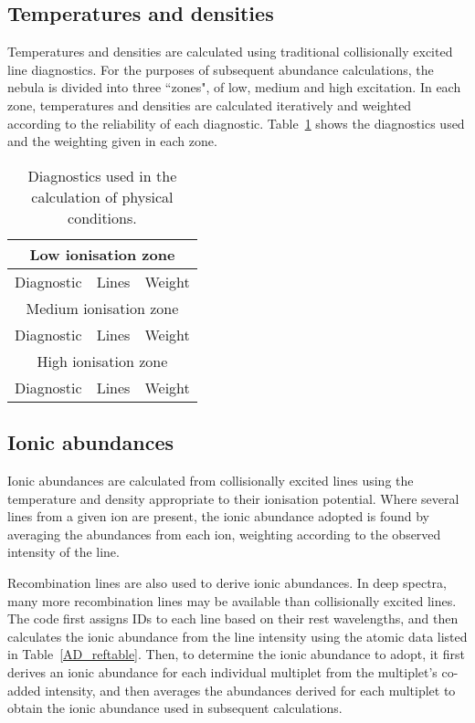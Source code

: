 \documentclass[useAMS,usenatbib]{mn2e}
\begin{document}
\subsection{Temperatures and densities}

Temperatures and densities are calculated using traditional collisionally excited line diagnostics.  For the purposes of subsequent abundance calculations, the nebula is divided into three ``zones", of low, medium and high excitation.  In each zone, temperatures and densities are calculated iteratively and weighted according to the reliability of each diagnostic.  Table~\ref{zonestable} shows the diagnostics used and the weighting given in each zone.

\begin{table}
\begin{tabular}{ccc}
\hline
\multicolumn{3}{c}{Low ionisation zone}\\
\hline
Diagnostic & Lines & Weight \\
\hline
\multicolumn{3}{c}{Medium ionisation zone}\\
\hline
Diagnostic & Lines & Weight \\
\hline
\multicolumn{3}{c}{High ionisation zone}\\
\hline
Diagnostic & Lines & Weight \\
\end{tabular}
\label{zonestable}
\caption{Diagnostics used in the calculation of physical conditions.}
\end{table}

\subsection{Ionic abundances}

Ionic abundances are calculated from collisionally excited lines using the temperature and density appropriate to their ionisation potential.  Where several lines from a given ion are present, the ionic abundance adopted is found by averaging the abundances from each ion, weighting according to the observed intensity of the line.

Recombination lines are also used to derive ionic abundances.  In deep spectra, many more recombination lines may be available than collisionally excited lines.  The code first assigns IDs to each line based on their rest wavelengths, and then calculates the ionic abundance from the line intensity using the atomic data listed in Table~\ref{AD_reftable}.  Then, to determine the ionic abundance to adopt, it first derives an ionic abundance for each individual multiplet from the multiplet's co-added intensity, and then averages the abundances derived for each multiplet to obtain the ionic abundance used in subsequent calculations.
\end{document}
